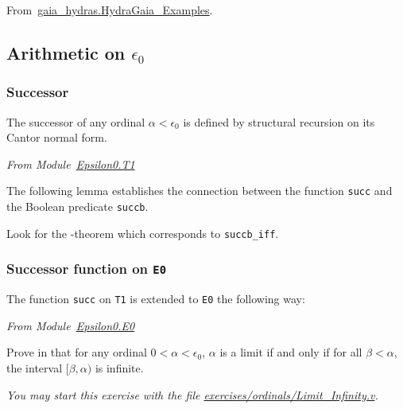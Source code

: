  From~\href{../theories/html/gaia_hydras.HydraGaia_Examples.html}{gaia\_hydras.HydraGaia\_Examples}.

  





\subsection{Arithmetic on \texorpdfstring{$\epsilon_0$}{epsilon0}}
\subsubsection{Successor}


The successor of any ordinal $\alpha< \epsilon_0$ is defined by structural 
recursion on its Cantor normal form.

\label{Functions:succ-T1}

\vspace{4pt}
\emph{From Module~\href{../theories/html/hydras.Epsilon0.T1.html\#succ}{Epsilon0.T1}}




The following lemma establishes the connection between the  function
\texttt{succ} and the Boolean predicate \texttt{succb}.

\vspace{4pt}



\begin{exercise}[\gaia]
  Look for the \gaia-theorem which corresponds to \texttt{succb\_iff}.
\end{exercise}

\subsubsection{Successor function on \texttt{E0}}

The function \texttt{succ} on \texttt{T1} is extended to \texttt{E0} the following way:

 \emph{From Module~\href{../theories/html/hydras.Epsilon0.E0.html}{Epsilon0.E0}}


 
 \begin{exercise}
Prove in \coq{} that for any ordinal $0< \alpha<\epsilon_0$, $\alpha$ is a limit if 
and only if for all $\beta<\alpha$, the interval $[\beta,\alpha)$ is
infinite.

\emph{You may start this exercise with the file
     \href{https://github.com/coq-community/hydra-battles/tree/master/exercises/ordinals/Limit_Infinity.v}{exercises/ordinals/Limit\_Infinity.v}.}
 \end{exercise}

